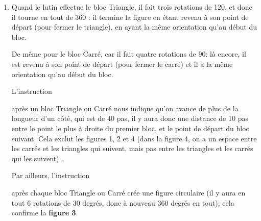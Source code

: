 \documentclass[12pt,a4paper,french]{article}
\begin{document}
\begin{enumerate}
	\begin{itemize}
		\item \textbf{K} représente l'angle de rotation de Scratch, pour un angle souhaité de 60\textdegree{} entre les segments, donc \quad $\textbf{K}=180 -60 = 120$;

		\item \textbf{N} représente l'angle de rotation de Scratch, pour un angle souhaité de 90\textdegree{} entre les segments, donc  \quad $\textbf{N}=180-90= 90$.
	\end{itemize}

	\item Quand le lutin effectue le bloc Triangle, il fait trois rotations de 120\textdegree, et donc il tourne en tout de 360\textdegree{} : il termine la figure en étant revenu à son point de départ (pour fermer le triangle), en ayant la même orientation qu'au début du bloc.

	De même pour le bloc Carré, car il fait quatre rotations de 90\textdegree : là encore, il est revenu à son point de départ (pour fermer le carré) et il a la même orientation qu'au début du bloc.

	L'instruction \begin{scratch}\end{scratch} après un bloc Triangle ou Carré nous indique qu'on avance de plus de la longueur d'un côté, qui est de 40 pas, il y aura donc une distance de 10 pas entre le point le plus à droite du premier bloc, et le point de départ du bloc suivant. Cela exclut les figures 1, 2 et 4 (dans la figure 4, on a un espace entre les carrés et les triangles qui suivent, mais pas entre les triangles et les carrés qui les suivent) 	.

	Par ailleurs, l'instruction \begin{scratch}\end{scratch} après chaque bloc Triangle ou Carré crée une figure \og circulaire \fg{} (il y aura en tout 6 rotations de 30 degrés, donc à nouveau 360 degrés en tout); cela confirme la \textbf{figure 3}.
\end{enumerate}
\end{document}
